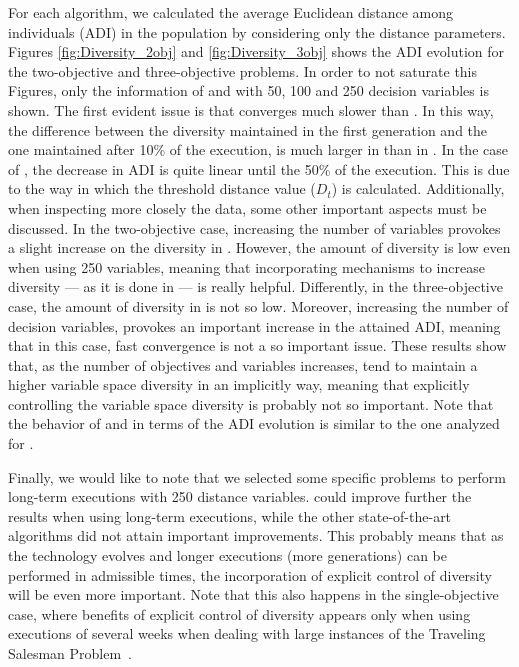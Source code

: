 For each algorithm, we calculated the average Euclidean distance among individuals (ADI) in the population by considering only 
the distance parameters.
%
Figures \ref{fig:Diversity_2obj} and \ref{fig:Diversity_3obj} shows the ADI evolution for the two-objective and three-objective problems.
%
In order to not saturate this Figures, only the information of \VSDMOEA{} and \RMOEA{} with 50, 100 and 250 decision variables is shown.
%
The first evident issue is that \VSDMOEA{} converges much slower than \RMOEA{}.
%
In this way, the difference between the diversity maintained in the first generation and the one maintained after 10\% of the execution,
is much larger in \RMOEA{} than in \VSDMOEA{}.
%
In the case of \VSDMOEA{}, the decrease in ADI is quite linear until the 50\% of the execution.
%
This is due to the way in which the threshold distance value ($D_t$) is calculated.
%
Additionally, when inspecting more closely the data, some other important aspects must be discussed. 
%
In the two-objective case, increasing the number of variables provokes a slight increase on the diversity in \RMOEA{}.
%
However, the amount of diversity is low even when using 250 variables, meaning that incorporating mechanisms to increase diversity --- as it is done in \VSDMOEA{} ---
is really helpful.
%
Differently, in the three-objective case, the amount of diversity in \RMOEA{} is not so low.
%
Moreover, increasing the number of decision variables, provokes an important increase in the attained ADI, meaning that in this case,
fast convergence is not a so important issue.
%
These results show that, as the number of objectives and variables increases, \MOEAS{} tend to maintain a higher variable space diversity
in an implicitly way, meaning that explicitly controlling the variable space diversity is probably not so important.
%
Note that the behavior of \NSGAII{} and \MOEAD{} in terms of the ADI evolution is similar to the one analyzed for \RMOEA{}.

Finally, we would like to note that we selected some specific problems to perform long-term executions with 250 distance variables.
%
\VSDMOEA{} could improve further the results when using long-term executions, while the other state-of-the-art algorithms did not attain
important improvements.
%
This probably means that as the technology evolves and longer executions (more generations) can be performed in admissible times,
the incorporation of explicit control of diversity will be even more important.
%
Note that this also happens in the single-objective case, where benefits of explicit control of diversity appears only when using executions of
several weeks when dealing with large instances of the Traveling Salesman Problem~\cite{segura2015novel}.
%






